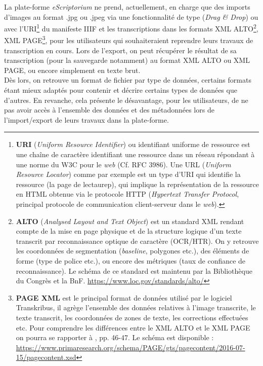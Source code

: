 La plate-forme \textit{eScriptorium} ne prend, actuellement, en charge que des imports d'images au format .jpg ou .jpeg via une fonctionnalité de type  (\textit{Drag \& Drop}) ou avec l'URI\footnote{\textbf{URI} (\textit{Uniform Resource Identifier}) ou identifiant uniforme de ressource est une chaîne de caractère identifiant une ressource dans un réseau répondant à une norme du W3C pour le \textit{web} (Cf. RFC 3986). Une URL (\textit{Uniform Resource Locator}) comme par exemple  est un type d'URI qui identifie la ressource (la page de lectaurep), qui implique la représentation de la ressource en HTML obtenue via le protocole HTTP (\textit{Hypertext Transfer Protocol}, principal protocole de communication client-serveur dans le \textit{web}).} du manifeste IIIF et les transcriptions dans les formats XML ALTO\footnote{\textbf{ALTO} (\textit{Analysed Layout and Text Object}) est un standard XML rendant compte de la mise en page physique et de la structure logique d'un texte transcrit par reconnaissance optique de caractère (OCR/HTR). On y retrouve les coordonnées de segmentation (\textit{baseline}, polygones etc.), des éléments de forme (type de police etc.), ou encore des métriques (taux de confiance de reconnaissance). Le schéma de ce standard est maintenu par la Bibliothèque du Congrès et la BnF. \url{https://www.loc.gov/standards/alto/}}, XML PAGE\footnote{\textbf{PAGE XML} est le principal format de données utilisé par le logiciel Transkribus, il agrège l'ensemble des données relatives à l'image transcrite, le texte transcrit, les coordonnées de zones de texte, les corrections effectuées etc. Pour comprendre les différences entre le XML ALTO et le XML PAGE on pourra se rapporter à \cite{bonhomme_defis_2018}, pp. 46-47. Le schéma est disponible : \url{https://www.primaresearch.org/schema/PAGE/gts/pagecontent/2016-07-15/pagecontent.xsd}}, pour les utilisateurs qui souhaiteraient reprendre leurs travaux de transcription en cours. Lors de l'export, on peut récupérer le résultat de sa transcription (pour la sauvegarde notamment) au format XML ALTO ou XML PAGE, ou encore simplement en texte brut.\\

Dès lors, on retrouve un format de fichier par type de données, certains formats étant mieux adaptés pour contenir et décrire certains types de données que d'autres. En revanche, cela présente le désavantage, pour les utilisateurs, de ne pas avoir accès à l'ensemble des données et des métadonnées lors de l'import/export de leurs travaux dans la plate-forme.\\

